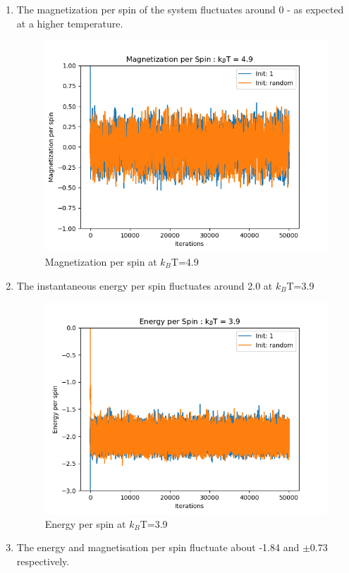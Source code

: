 \documentclass[11 pt]{article}
\begin{document}
\begin{enumerate}[resume]
\item The magnetization per spin of the system fluctuates around 0 - as expected at a higher temperature.
\begin{figure}[h]
\begin{center}
\includegraphics[width=3.7 in]{"../figures/Q3_Magnetization.png"}
\caption{Magnetization per spin at $k_B$T=4.9}
\label{mag4.9}
\end{center}
\end{figure}
\item The instantaneous energy per spin fluctuates around 2.0 at $k_B$T=3.9
\begin{figure}[h]
\begin{center}
\includegraphics[width=3.7 in]{"../figures/Q4_Energy.png"}
\caption{Energy per spin at $k_B$T=3.9}
\label{energy3.9}
\end{center}
\end{figure}
\item The energy and magnetisation per spin fluctuate about -1.84 and $\pm 0.73$ respectively.
\begin{figure}[h]
\begin{center}

\end{center}
\end{figure}
\end{enumerate}
\end{document}
